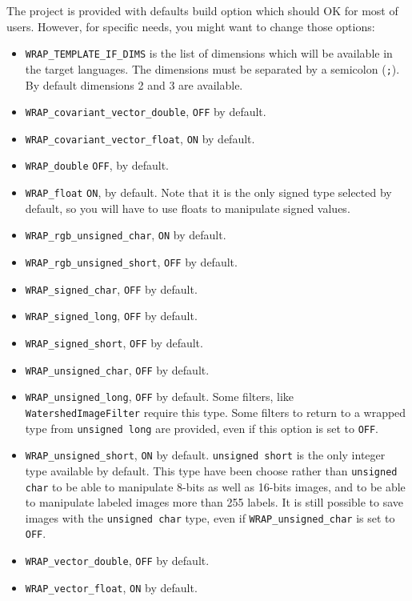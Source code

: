 \documentclass{InsightArticle}
\begin{document}
The project is provided with defaults build option which should OK for most of
users. However, for specific needs, you might want to change those options:
\begin{itemize}
  \item \verb$WRAP_TEMPLATE_IF_DIMS$ is the list of dimensions which will be available in the
target languages. The dimensions must be separated by a semicolon (\verb$;$).
By default dimensions 2 and 3 are available.
  \item \verb$WRAP_covariant_vector_double$, \verb$OFF$ by default.
  \item \verb$WRAP_covariant_vector_float$, \verb$ON$ by default.
  \item \verb$WRAP_double$ \verb$OFF$, by default.
  \item \verb$WRAP_float$ \verb$ON$, by default. Note that it is the only signed
type selected by default, so you will have to use floats to manipulate signed
values.
  \item \verb$WRAP_rgb_unsigned_char$, \verb$ON$ by default.
  \item \verb$WRAP_rgb_unsigned_short$, \verb$OFF$ by default.
  \item \verb$WRAP_signed_char$, \verb$OFF$ by default.
  \item \verb$WRAP_signed_long$, \verb$OFF$ by default.
  \item \verb$WRAP_signed_short$, \verb$OFF$ by default.
  \item \verb$WRAP_unsigned_char$, \verb$OFF$ by default.
  \item \verb$WRAP_unsigned_long$, \verb$OFF$ by default. Some filters, like
\verb$WatershedImageFilter$ require this type. Some filters to return to a
wrapped type from \verb$unsigned long$ are provided, even if this option is
set to \verb$OFF$.
  \item \verb$WRAP_unsigned_short$, \verb$ON$ by default. \verb$unsigned short$
is the only integer type available by default. This type have been choose rather
than \verb$unsigned char$ to be able to manipulate 8-bits as well as 16-bits images,
and to be able to manipulate labeled images more than 255 labels. It is still
possible to save images with the \verb$unsigned char$ type, even if
\verb$WRAP_unsigned_char$ is set to \verb$OFF$.
  \item \verb$WRAP_vector_double$, \verb$OFF$ by default.
  \item \verb$WRAP_vector_float$, \verb$ON$ by default.

\end{itemize}
\end{document}
